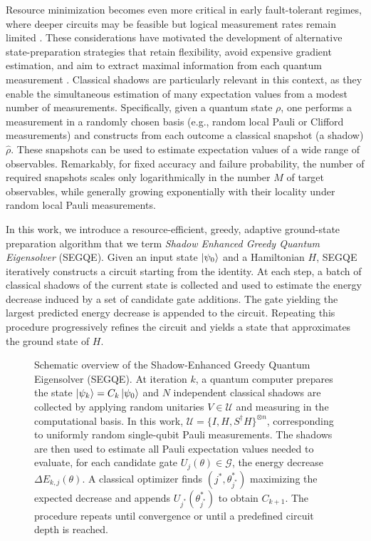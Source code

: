 Resource minimization becomes even more critical in early fault-tolerant regimes, where deeper circuits may be feasible but logical measurement rates remain limited \cite{zimboras2025myths}. These considerations have motivated the development of alternative state-preparation strategies that retain flexibility, avoid expensive gradient estimation, and aim to extract maximal information from each quantum measurement \cite{boyd2022training, hwang2025preparing, puig2026warm,grimsley2019adaptive, nakanishi2020sequential}. 
Classical shadows \cite{huang2020predicting} are particularly relevant in this context, as they enable the simultaneous estimation of many expectation values from a modest number of measurements. Specifically, given a quantum state $\rho$, one performs a measurement in a randomly chosen basis (e.g., random local Pauli or Clifford measurements) and constructs from each outcome a classical snapshot (a shadow) $\hat{\rho}$. These snapshots can be used to estimate expectation values of a wide range of observables. Remarkably, for fixed accuracy and failure probability, the number of required snapshots scales only logarithmically in the number $M$ of target observables, while generally growing exponentially with their locality under random local Pauli measurements. 

In this work, we introduce a resource-efficient, greedy, adaptive ground-state preparation algorithm that we term \emph{Shadow Enhanced Greedy Quantum Eigensolver} (SEGQE). Given an input state $\ket{\psi_0}$ and a Hamiltonian $H$, SEGQE iteratively constructs a circuit starting from the identity. At each step, a batch of classical shadows of the current state is collected and used to estimate the energy decrease induced by a set of candidate gate additions. The gate yielding the largest predicted energy decrease is appended to the circuit. Repeating this procedure progressively refines the circuit and yields a state that approximates the ground state of $H$. 

\begin{figure}[htbp]
	\begin{center}
	\end{center}
	\caption{Schematic overview of the Shadow-Enhanced Greedy Quantum Eigensolver (SEGQE). At iteration $k$, a quantum computer prepares the state $\ket{\psi_k}=C_k\ket{\psi_0}$ and $N$ independent classical shadows are collected by applying random unitaries $V\in \mathcal{U}$ and measuring in the computational basis. In this work, $\mathcal{U}=\{I, H, S^\dagger H\}^{\otimes n}$, corresponding to uniformly random single-qubit Pauli measurements. The shadows are then used to estimate all Pauli expectation values needed to evaluate, for each candidate gate $U_j(\theta)\in\mathcal{G}$, the energy decrease $\Delta E_{k,j}(\theta)$. A classical optimizer finds $(j^*, \theta^*_{j^*})$ maximizing the expected decrease and appends $U_{j^*}(\theta^*_{j^*})$ to obtain $C_{k+1}$. The procedure repeats until convergence or until a predefined circuit depth is reached.}
	\label{fig:SEGQE}
\end{figure}

